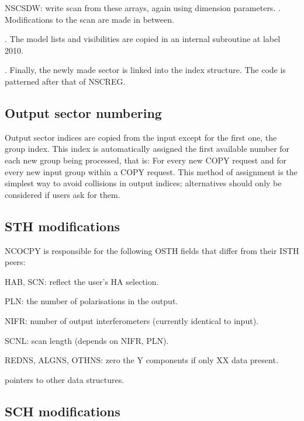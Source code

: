 \item   NSCSDW: write scan from these arrays, again using dimension parameters.
\ei
.       Modifications to the scan are made in between.

.       The model lists and visibilities are copied in an internal subroutine
at label 2010.

.       Finally, the newly made sector is linked into the index structure. The
code is patterned after that of NSCREG.


\subsection{ Output sector numbering }

	Output sector indices are copied from the input except for the first
one, the group index. This index is automatically assigned the first available
number for each new group being processed, that is: For every new COPY request
and for every new input group within a COPY request. This method of assignment
is the simplest way to avoid collisions in output indices; alternatives should
only be considered if users ask for them.


\subsection{ STH modifications }


	NCOCPY is responsible for the following OSTH fields that differ from
their ISTH peers:
\bi
\item   HAB, SCN: reflect the user's HA selection.

\item   PLN: the number of polarisations in the output.

\item   NIFR: number of output interferometers (currently identical to input).

\item   SCNL: scan length (depends on NIFR, PLN).

\item   REDNS, ALGNS, OTHNS: zero the Y components if only XX data present.

\item   pointers to other data structures.
\ei


\subsection{ SCH modifications }


